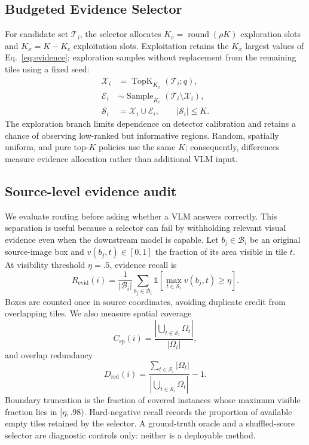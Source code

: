 \subsection{Budgeted Evidence Selector}
For candidate set $\mathcal{T}_i$, the selector allocates $K_e=\operatorname{round}(\rho K)$ exploration slots and $K_x=K-K_e$ exploitation slots. Exploitation retains the $K_x$ largest values of Eq.~\eqref{eq:evidence}; exploration samples without replacement from the remaining tiles using a fixed seed:
\begin{align}
\mathcal{X}_i &= \operatorname{TopK}_{K_x}(\mathcal{T}_i;q), \\
\mathcal{E}_i &\sim \operatorname{Sample}_{K_e}(\mathcal{T}_i\setminus\mathcal{X}_i), \\
\mathcal{S}_i &= \mathcal{X}_i\cup\mathcal{E}_i,\qquad |\mathcal{S}_i|\le K.
\label{eq:router}
\end{align}
The exploration branch limits dependence on detector calibration and retains a chance of observing low-ranked but informative regions. Random, spatially uniform, and pure top-$K$ policies use the same $K$; consequently, differences measure evidence allocation rather than additional VLM input.

\subsection{Source-level evidence audit}
We evaluate routing before asking whether a VLM answers correctly. This separation is useful because a selector can fail by withholding relevant visual evidence even when the downstream model is capable. Let $b_j\in\mathcal{B}_i$ be an original source-image box and $v(b_j,t)\in[0,1]$ the fraction of its area visible in tile $t$. At visibility threshold $\eta=.5$, evidence recall is
\begin{equation}
R_{\mathrm{evid}}(i)=\frac{1}{|\mathcal{B}_i|}
\sum_{b_j\in\mathcal{B}_i}\mathbb{1}\!\left[
\max_{t\in\mathcal{S}_i}v(b_j,t)\ge\eta\right].
\label{eq:evidence-recall}
\end{equation}
Boxes are counted once in source coordinates, avoiding duplicate credit from overlapping tiles. We also measure spatial coverage
\begin{equation}
C_{\mathrm{sp}}(i)=
\frac{\left|\bigcup_{t\in\mathcal{S}_i}\Omega_t\right|}{|\Omega_i|},
\label{eq:spatial-coverage}
\end{equation}
and overlap redundancy
\begin{equation}
D_{\mathrm{red}}(i)=
\frac{\sum_{t\in\mathcal{S}_i}|\Omega_t|}
{\left|\bigcup_{t\in\mathcal{S}_i}\Omega_t\right|}-1.
\label{eq:redundancy}
\end{equation}
Boundary truncation is the fraction of covered instances whose maximum visible fraction lies in $[\eta,.98)$. Hard-negative recall records the proportion of available empty tiles retained by the selector. A ground-truth oracle and a shuffled-score selector are diagnostic controls only: neither is a deployable method.

